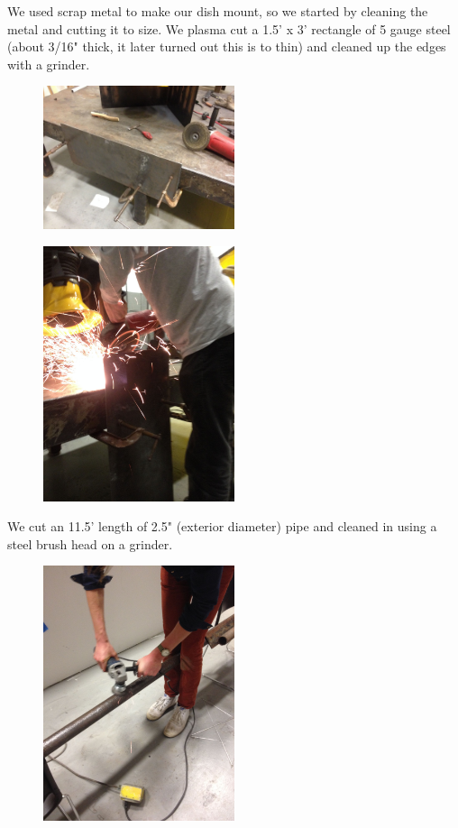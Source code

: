 \documentclass[11pt]{article} %
\begin{document}
We used scrap metal to make our dish mount, so we started by cleaning the metal and cutting it to size. We plasma cut a 1.5' x 3' rectangle of 5 gauge steel (about 3/16" thick, it later turned out this is to thin) and cleaned up the edges with a grinder.



\begin{figure}
  \centering
  \caption{   }
  \includegraphics[width=0.50\textwidth]{roofmount/01.jpeg}
\end{figure}

\begin{figure}
  \centering
  \caption{   }
  \includegraphics[width=0.50\textwidth]{roofmount/02.jpeg}
\end{figure}


We cut an 11.5' length of 2.5" (exterior diameter) pipe and cleaned in using a steel brush head on a grinder.

\begin{figure}
  \centering
  \caption{   }
  \includegraphics[width=0.50\textwidth]{roofmount/03.jpeg}
\end{figure}
\end{document}
